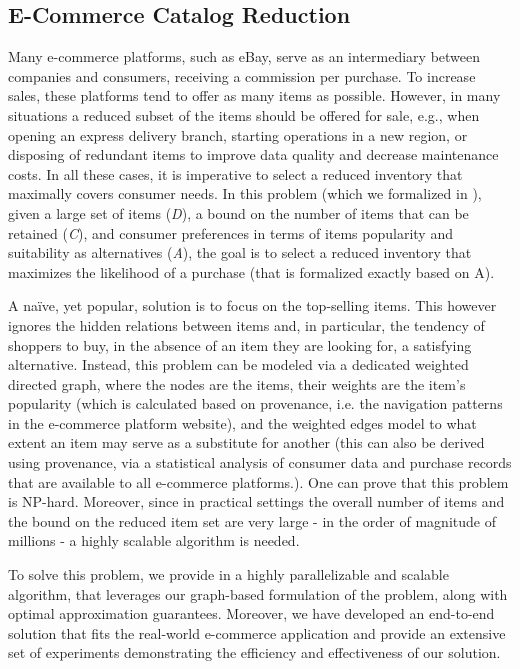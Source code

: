 \documentclass[11pt,dvipdfm]{article}
\begin{document}
\subsection{E-Commerce Catalog Reduction}
\label{ssec: inventory}

Many e-commerce platforms, such as eBay, serve as an intermediary between companies and consumers, receiving a commission per purchase. To increase sales, these platforms tend to offer as many items as possible. However, in many situations a reduced subset of the items should be offered for sale, e.g., when opening an express delivery branch, starting operations in a new region, or disposing of redundant items to improve data quality and decrease maintenance costs.
In all these cases, it is imperative to select a reduced inventory that maximally covers consumer needs. In this problem (which we formalized in \cite{EDBT20}), given a large set of items (\textit{D}), a bound on the number of items that can be retained (\textit{C}), and consumer preferences in terms of items popularity and suitability as alternatives (\textit{A}), the goal is to select a reduced inventory that maximizes the likelihood of a purchase (that is formalized exactly based on A). 

 A na\"{i}ve, yet popular, solution is to focus on the top-selling items. This however ignores the hidden relations between items and, in particular, the tendency of shoppers to buy, in the absence of an item they are looking for, a satisfying alternative. 
Instead, this problem can be modeled via a dedicated weighted directed graph, where the nodes are the items, their weights are the item's popularity (which is calculated based on provenance, i.e. the navigation patterns in the e-commerce platform website), and the weighted edges model to what extent an item may serve as a substitute for another (this can also be derived using provenance, via a statistical analysis of consumer data and purchase records that are available to all e-commerce platforms.).
One can prove that this problem is NP-hard. Moreover, since in practical settings the overall number of items and the bound on the reduced item set are very large - in the order of magnitude of millions - a highly scalable algorithm is needed. 

To solve this problem, we provide in \cite{EDBT20} a highly parallelizable and scalable algorithm, that leverages our graph-based formulation of the problem, along with optimal approximation guarantees.  Moreover, we have developed an end-to-end solution that fits the real-world e-commerce application and provide an extensive set of experiments demonstrating the efficiency and effectiveness of our solution. 
\end{document}
